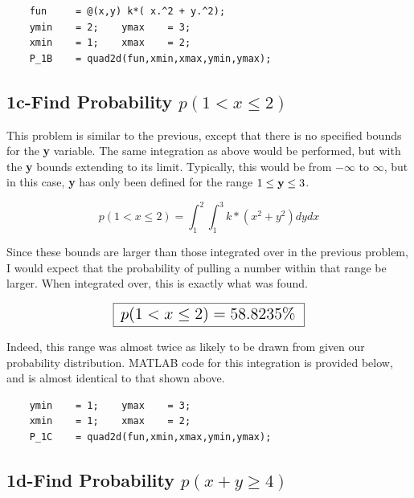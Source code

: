 \documentclass[]{article}
\begin{document}
\begin{lstlisting}
	fun     = @(x,y) k*( x.^2 + y.^2);
	ymin    = 2;	ymax    = 3;
	xmin    = 1; 	xmax    = 2;
	P_1B    = quad2d(fun,xmin,xmax,ymin,ymax);
\end{lstlisting}





\subsection*{1c-Find Probability $ p(1<x\le{2})   $}

This problem is similar to the previous, except that there is no specified bounds for the {\bf y} variable. The same integration as above would be performed, but with the {\bf y} bounds extending to its limit. Typically, this would be from $ -\infty $ to $ \infty $, but in this case, {\bf y} has only been defined for the range $ 1 \le {\bf y} \le 3 $.

\begin{displaymath}
	p(  1<x\le{2}  ) = \int_1^2{\int_1^3 {k*(x^2+y^2)   dy} dx }
\end{displaymath}  

\noindent Since these bounds are larger than those integrated over in the previous problem, I would expect that the probability of pulling a number within that range be larger. When integrated over, this is exactly what was found. 


\begin{displaymath}
	\fbox{    \Large $p(  1<x\le{2}  ) = 58.8235\%$   }
\end{displaymath}  

\noindent Indeed, this range was almost twice as likely to be drawn from given our probability distribution. MATLAB code for this integration is provided below, and is almost identical to that shown above. 

\begin{lstlisting}
	ymin    = 1;	ymax    = 3;
	xmin    = 1; 	xmax    = 2;
	P_1C    = quad2d(fun,xmin,xmax,ymin,ymax);
\end{lstlisting}




\subsection*{1d-Find Probability $ p(x+y \ge 4 )   $}
\end{document}
